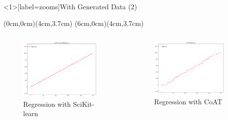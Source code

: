 \begin{frame}<1>[label=zooms]{With Generated Data (2)}

    (0cm,0cm)(4cm,3.7cm) %
    (6cm,0cm)(4cm,3.7cm) %
	
    \begin{columns} %
        \begin{column}{0.48\textwidth}
            \begin{figure}
                \centering
                \includegraphics[width=0.9\textwidth]{img/b.png}
                Regression with SciKit-learn
            \end{figure}
        \end{column}
        \begin{column}{0.48\textwidth}
            \begin{figure}
                \centering
                \includegraphics[width=0.9\textwidth]{img/c.png}
                Regression with CoAT
            \end{figure}
        \end{column}
    \end{columns}


\end{frame}
